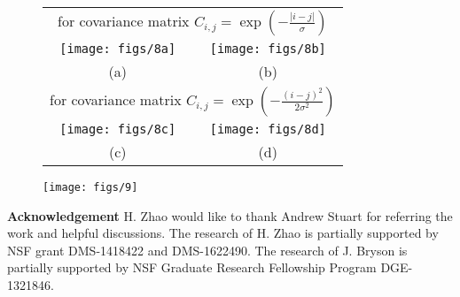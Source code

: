 \documentclass[11pt]{amsart}
\begin{document}
\begin{figure}[htb]
\begin{center}
\begin{tabular}{cc}
\multicolumn{2}{c}{for covariance matrix $C_{i,j}=\exp(-\frac{|i-j|}{\sigma})$}
\\
\texttt{[image: figs/8a]} & \texttt{[image: figs/8b]}
\\
(a)   & (b) 
\\
\multicolumn{2}{c}{for covariance matrix $C_{i,j}=\exp(-\frac{(i-j)^2}{2\sigma^2})$}
\\
\texttt{[image: figs/8c]} & \texttt{[image: figs/8d]}
\\
(c)   & (d) 
\end{tabular}
\end{center}
\caption{}
\label{fig:correlated}
\end{figure}
	
\begin{figure}[htb]
\texttt{[image: figs/9]}	
\caption{}
\label{fig:convergence}
\end{figure}

{\bf Acknowledgement} H. Zhao would like to thank Andrew Stuart for referring the work \cite{schwab2006karhunen} and helpful discussions. The research of H. Zhao is partially supported by NSF grant DMS-1418422 and DMS-1622490. The research of J. Bryson is partially supported by NSF Graduate Research Fellowship Program DGE-1321846.
	
\end{document}
